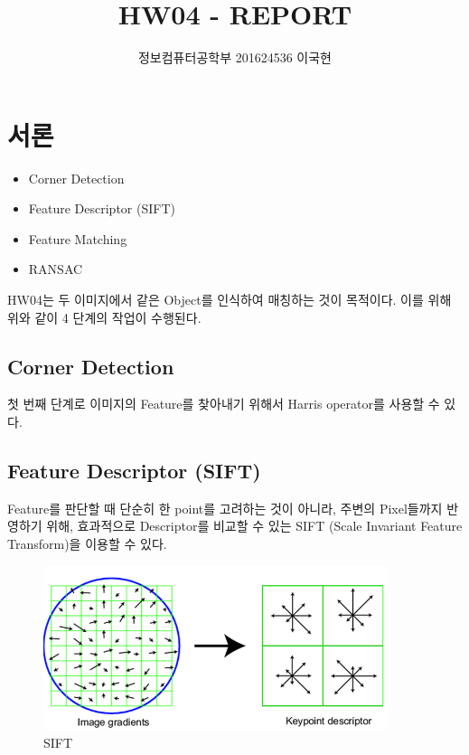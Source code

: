 \documentclass[]{report}
\title{HW04 - REPORT}
\author{정보컴퓨터공학부 201624536 이국현}
\begin{document}
\maketitle
\chapter{서론}

\begin{itemize}
	\item Corner Detection
	\item Feature Descriptor (SIFT)
	\item Feature Matching
	\item RANSAC\\
\end{itemize}

HW04는 두 이미지에서 같은 Object를 인식하여 매칭하는 것이 목적이다. 이를 위해 위와 같이 4 단계의 작업이 수행된다.\\

\section{Corner Detection}

첫 번째 단계로 이미지의 Feature를 찾아내기 위해서 Harris operator를 사용할 수 있다.\\


\section{Feature Descriptor (SIFT)}

Feature를 판단할 때 단순히 한 point를 고려하는 것이 아니라, 주변의 Pixel들까지 반영하기 위해,
효과적으로 Descriptor를 비교할 수 있는 SIFT (Scale Invariant Feature Transform)을 이용할 수 있다.\\

\begin{figure}[ht!]
	\centering
	\includegraphics[width=0.9\textwidth]{image/1-2-SIFT.png}
	\caption{SIFT}
	\label{1-2}
\end{figure}
\end{document}
